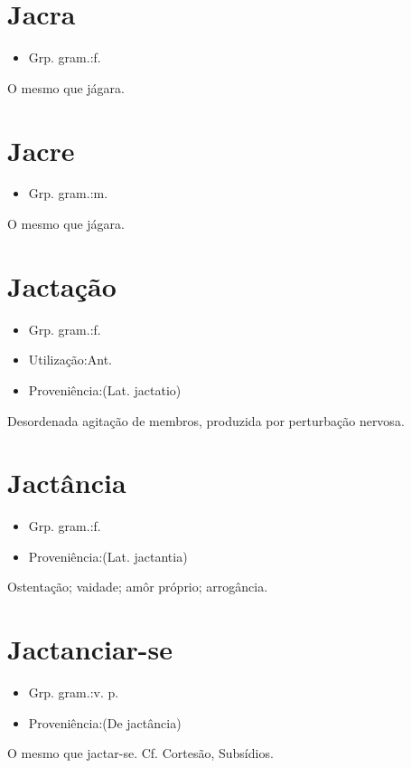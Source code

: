 \documentclass{article}
\begin{document}
\section{Jacra}
\begin{itemize}
\item {Grp. gram.:f.}
\end{itemize}
O mesmo que \textunderscore jágara\textunderscore .
\section{Jacre}
\begin{itemize}
\item {Grp. gram.:m.}
\end{itemize}
O mesmo que \textunderscore jágara\textunderscore .
\section{Jactação}
\begin{itemize}
\item {Grp. gram.:f.}
\end{itemize}
\begin{itemize}
\item {Utilização:Ant.}
\end{itemize}
\begin{itemize}
\item {Proveniência:(Lat. \textunderscore jactatio\textunderscore )}
\end{itemize}
Desordenada agitação de membros, produzida por perturbação nervosa.
\section{Jactância}
\begin{itemize}
\item {Grp. gram.:f.}
\end{itemize}
\begin{itemize}
\item {Proveniência:(Lat. \textunderscore jactantia\textunderscore )}
\end{itemize}
Ostentação; vaidade; amôr próprio; arrogância.
\section{Jactanciar-se}
\begin{itemize}
\item {Grp. gram.:v. p.}
\end{itemize}
\begin{itemize}
\item {Proveniência:(De \textunderscore jactância\textunderscore )}
\end{itemize}
O mesmo que \textunderscore jactar-se\textunderscore . Cf. Cortesão, \textunderscore Subsídios\textunderscore .
\end{document}
